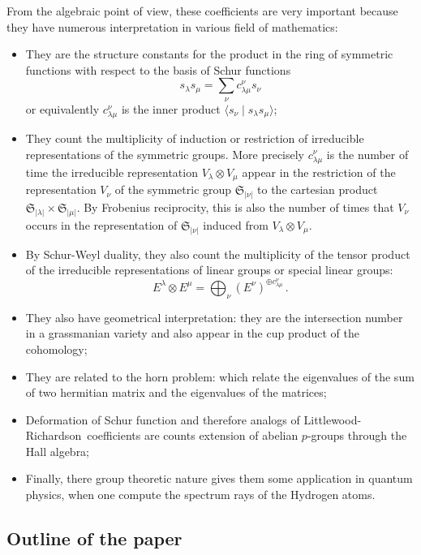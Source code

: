 \documentclass[12pt,a4paper]{article}
\newcommand{\LR}{Littlewood-Richardson\ }
\newcommand{\SG}{{\mathfrak S}}
\begin{document}
From the algebraic point of view, these coefficients are very important
because they have numerous interpretation in various field of mathematics:
\begin{itemize}
\item They are the structure constants for the product in the ring of
  symmetric functions with respect to the basis of Schur functions
  \begin{equation}
    s_\lambda s_\mu =\sum_\nu c_{\lambda\mu}^\nu s_\nu
  \end{equation}
  or equivalently $c_{\lambda\mu}^\nu$ is the inner product $\langle s_\nu
  \mid s_\lambda s_\mu\rangle$;
\item They count the multiplicity of induction or restriction of irreducible
  representations of the symmetric groups. More precisely $c_{\lambda\mu}^\nu$
  is the number of time the irreducible representation $V_\lambda \otimes
  V_\mu$ appear in the restriction of the representation $V_\nu$ of the
  symmetric group $\SG_{|\nu|}$ to the cartesian product $\SG_{|\lambda|}
  \times \SG_{|\mu|}$. By Frobenius reciprocity, this is also the number of
  times that $V_\nu$ occurs in the representation of $\SG_{|\nu|}$ induced
  from $V_\lambda \otimes V_\mu$.
\item By Schur-Weyl duality, they also count the multiplicity of the tensor
  product of the irreducible representations of linear groups or special
  linear groups:
  \begin{equation}
    E^\lambda \otimes E^\mu =\bigoplus_\nu (E^\nu)^{\oplus c_{\lambda\mu}^\nu}\,.
  \end{equation}
\item They also have geometrical interpretation: they are the intersection
  number in a grassmanian variety and also appear in the cup product of the
  cohomology;
\item They are related to the horn problem: which relate the eigenvalues of
  the sum of two hermitian matrix and the eigenvalues of the matrices;
\item Deformation of Schur function and therefore analogs of \LR coefficients
  are counts extension of abelian $p$-groups through the Hall algebra;
\item Finally, there group theoretic nature gives them some application in
  quantum physics, when one compute the spectrum rays of the Hydrogen atoms.
\end{itemize}

\subsection{Outline of the paper}
\end{document}
